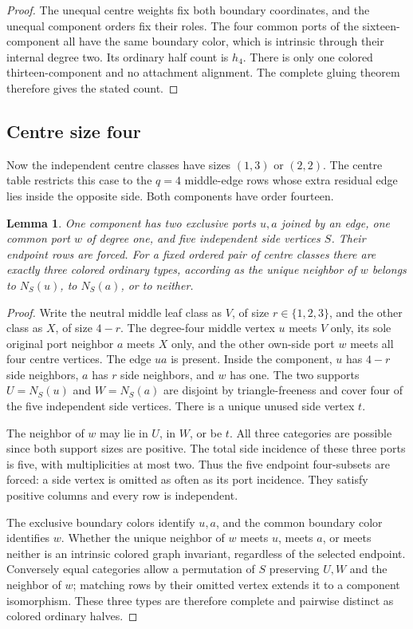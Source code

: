 \documentclass[11pt]{article}
\newtheorem{lemma}[theorem]{Lemma}
\begin{document}
\begin{proof}
The unequal centre weights fix both boundary coordinates, and the
unequal component orders fix their roles. The four common ports of the
sixteen-component all have the same boundary color, which is intrinsic
through their internal degree two. Its ordinary half count is $h_4$.
There is only one colored thirteen-component and no attachment alignment.
The complete gluing theorem therefore gives the stated count.
\end{proof}

\subsection{Centre size four}

Now the independent centre classes have sizes $(1,3)$ or $(2,2)$.
The centre table restricts this case to the $q=4$ middle-edge rows whose
extra residual edge lies inside the opposite side. Both components have
order fourteen.

\begin{lemma}\label{leftemptyfour}
One component has two exclusive ports $u,a$ joined by an edge, one
common port $w$ of degree one, and five independent side vertices $S$.
Their endpoint rows are forced. For a fixed ordered pair of centre
classes there are exactly three colored ordinary types, according as
the unique neighbor of $w$ belongs to $N_S(u)$, to $N_S(a)$, or to
neither.
\end{lemma}
\begin{proof}
Write the neutral middle leaf class as $V$, of size $r\in\{1,2,3\}$,
and the other class as $X$, of size $4-r$. The degree-four middle
vertex $u$ meets $V$ only, its sole original port neighbor $a$ meets
$X$ only, and the other own-side port $w$ meets all four centre vertices.
The edge $ua$ is present. Inside the component, $u$ has $4-r$ side
neighbors, $a$ has $r$ side neighbors, and $w$ has one. The two supports
$U=N_S(u)$ and $W=N_S(a)$ are disjoint by triangle-freeness and cover
four of the five independent side vertices. There is a unique unused
side vertex $t$.

The neighbor of $w$ may lie in $U$, in $W$, or be $t$. All three
categories are possible since both support sizes are positive. The total
side incidence of these three ports is five, with multiplicities at most
two. Thus the five endpoint four-subsets are forced: a side vertex is
omitted as often as its port incidence. They satisfy positive columns
and every row is independent.

The exclusive boundary colors identify $u,a$, and the common boundary
color identifies $w$. Whether the unique neighbor of $w$ meets $u$, meets
$a$, or meets neither is an intrinsic colored graph invariant, regardless
of the selected endpoint. Conversely equal categories allow a permutation
of $S$ preserving $U,W$ and the neighbor of $w$; matching rows by their
omitted vertex extends it to a component isomorphism. These three types
are therefore complete and pairwise distinct as colored ordinary halves.
\end{proof}
\end{document}
